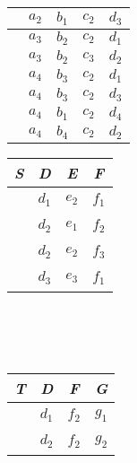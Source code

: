 \documentclass[UTF8]{ctexart}
\begin{document}
\begin{itemize}
\begin{table}[H]
{\begin{minipage}{0.35\textwidth}
\begin{tabular}{|c|c|c|c|c|}
					 & $a_{2}$ & $b_{1}$ & $c_{2}$ & $d_{3}$\\\hline	
					 					 
					 & $a_{3}$ & $b_{2}$ & $c_{2}$ & $d_{1}$\\\hline	
					 					 
					 & $a_{3}$ & $b_{2}$ & $c_{3}$ & $d_{2}$\\\hline	
					 					 
					 & $a_{4}$ & $b_{3}$ & $c_{2}$ & $d_{1}$\\\hline	
					 					 
					 & $a_{4}$ & $b_{3}$ & $c_{2}$ & $d_{3}$\\\hline	
					 					 
					 & $a_{4}$ & $b_{1}$ & $c_{2}$ & $d_{4}$\\\hline	
					 				 
					 & $a_{4}$ & $b_{4}$ & $c_{2}$ & $d_{2}$\\\hline	
					  
				\end{tabular}
			\end{minipage}
			\hfil
			\begin{minipage}{0.35\textwidth}
				
				\begin{tabular}{|c|c|c|c|}       \hline
					\textit{S} & \textit{D} & \textit{E} & \textit{F}     \\\hline
					~ & $d_{1}$ & $e_{2}$ & $f_{1}$ \\\hline
					
					~ & $d_{2}$ & $e_{1}$ & $f_{2}$ \\\hline
					
					~ & $d_{2}$ & $e_{2}$ & $f_{3}$ \\\hline
					
					~ & $d_{3}$ & $e_{3}$ & $f_{1}$ \\\hline
				\end{tabular}
			\\
			\\
			\\
			
				\begin{tabular}{|c|c|c|c|}       \hline
					\textit{T} & \textit{D} & \textit{F} & \textit{G}     \\\hline
					~ & $d_{1}$ & $f_{2}$ & $g_{1}$ \\\hline
					
					~ & $d_{2}$ & $f_{2}$ & $g_{2}$ \\\hline
					

\end{tabular}
\end{minipage}}
\end{table}
\end{itemize}
\end{document}
